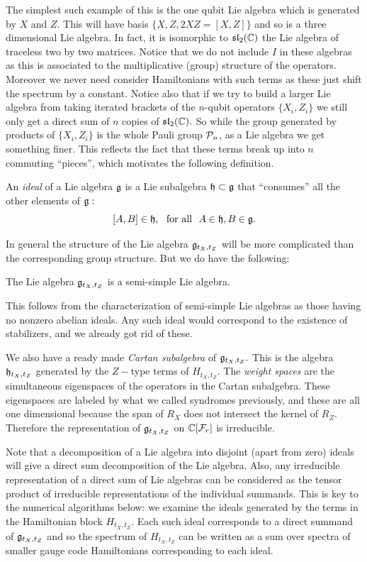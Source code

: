 The simplest such example of this is the one qubit Lie algebra
which is generated by $X$ and $Z.$
This will have basis $\{X, Z, 2XZ = [X, Z]\}$
and so is a three dimensional Lie algebra. In fact, it is isomorphic
to $\mathfrak{sl}_2(\mathbb{C})$ the Lie algebra of traceless two by two
matrices.
Notice that we do not include $I$ in these algebras as
this is associated to the multiplicative (group) structure
of the operators. Moreover we never need consider Hamiltonians
with such terms as these just shift the spectrum by a constant.
Notice also that if we try to build a larger Lie algebra
from taking iterated brackets of
the $n$-qubit operators $\{X_i, Z_i\}$ we still only get
a direct sum of $n$ copies of $\mathfrak{sl}_2(\mathbb{C}).$
So while the group generated by products of $\{X_i, Z_i\}$ is the
whole Pauli group $\mathcal{P}_n$, as a Lie algebra we get something finer.
This reflects the fact that these terms break up into $n$
commuting ``pieces'', which motivates the following definition. 

An \emph{ideal} of a Lie algebra $\mathfrak{g}$
is a Lie subalgebra $\mathfrak{h}\subset\mathfrak{g}$ that ``consumes''
all the other elements of $\mathfrak{g}:$
$$
    [A, B] \in \mathfrak{h}, \ \ \mbox{for all}\ \  A\in\mathfrak{h}, B\in\mathfrak{g}.
$$

In general the structure of the Lie algebra $\mathfrak{g}_{t_X,t_Z}$ 
will be more complicated than the corresponding group structure.
But we do have the following:
\begin{framed}
The Lie algebra $\mathfrak{g}_{t_X,t_Z}$ is a semi-simple Lie algebra.
\end{framed}
This follows from the characterization of
semi-simple Lie algebras as those having no
nonzero abelian ideals.
Any such ideal would correspond to the existence of 
stabilizers, and we already got rid of these.

We also have a ready made \emph{Cartan subalgebra} of $\mathfrak{g}_{t_X,t_Z}.$ 
This is the algebra $\mathfrak{h}_{t_X,t_Z}$ generated by the $Z-$type terms of $H_{t_X,t_Z}.$
The \emph{weight spaces} are the simultaneous eigenspaces
of the operators in the Cartan subalgebra. These
eigenspaces are labeled by what we called syndromes previously,
and these are all one dimensional because the span of $R_X$ does
not intersect the kernel of $R_Z.$
Therefore the representation of 
$\mathfrak{g}_{t_X,t_Z}$ on $\mathbb{C}[\mathcal{F}_{r}]$ is irreducible.

Note that a decomposition of a Lie algebra
into disjoint (apart from zero)
ideals will give a direct sum decomposition of
the Lie algebra.
Also, any irreducible representation of a direct sum of Lie algebras can
be considered as the tensor product of irreducible representations of the
individual summands.
This is key to the numerical algorithms below:
we examine the ideals generated by
the terms in the Hamiltonian block $H_{t_X,t_Z}.$
Each such ideal corresponds to a direct summand of $\mathfrak{g}_{t_X,t_Z}$ 
and so the spectrum of  $H_{t_X,t_Z}$
can be written as a sum over spectra of smaller gauge code Hamiltonians
corresponding to each ideal.

